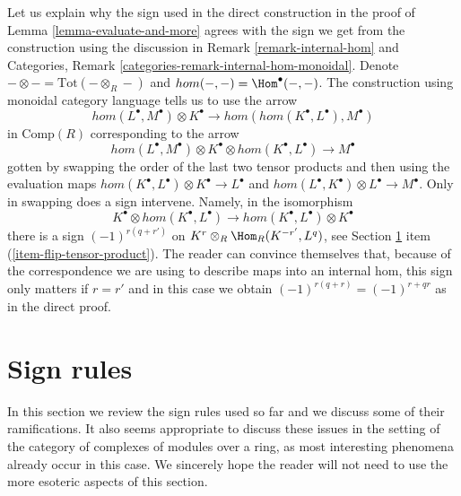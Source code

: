 \begin{remark}
\label{remark-sign-explanation}
Let us explain why the sign used in the direct construction in the proof
of Lemma \ref{lemma-evaluate-and-more} agrees with the sign we get
from the construction using the discussion in Remark \ref{remark-internal-hom}
and Categories, Remark \ref{categories-remark-internal-hom-monoidal}.
Denote $- \otimes - = \text{Tot}(- \otimes_R -)$ and
$hom(-, -) = \Hom^\bullet(-, -)$. The construction using monoidal
category language tells us to use the arrow
$$
hom(L^\bullet, M^\bullet) \otimes K^\bullet
\longrightarrow
hom(hom(K^\bullet, L^\bullet), M^\bullet)
$$
in $\text{Comp}(R)$ corresponding to the arrow
$$
hom(L^\bullet, M^\bullet) \otimes K^\bullet \otimes hom(K^\bullet, L^\bullet)
\longrightarrow
M^\bullet
$$
gotten by swapping the order of the last two tensor products and
then using the evaluation maps
$hom(K^\bullet, L^\bullet) \otimes K^\bullet \to L^\bullet$ and
$hom(L^\bullet, K^\bullet) \otimes L^\bullet \to M^\bullet$.
Only in swapping does a sign intervene. Namely, in the isomorphism
$$
K^\bullet \otimes hom(K^\bullet, L^\bullet)
\to
hom(K^\bullet, L^\bullet) \otimes K^\bullet
$$
there is a sign $(-1)^{r(q + r')}$ on
$K^r \otimes_R \Hom_R(K^{-r'}, L^q)$, see
Section \ref{section-sign-rules} item (\ref{item-flip-tensor-product}).
The reader can convince themselves that, because of the
correspondence we are using to describe maps into an internal hom,
this sign only matters if $r = r'$ and in this case
we obtain $(-1)^{r(q + r)} = (-1)^{r + qr}$ as in the direct proof.
\end{remark}







\section{Sign rules}
\label{section-sign-rules}

\noindent
In this section we review the sign rules used so far and we discuss
some of their ramifications. It also seems appropriate to discuss
these issues in the setting of the category of complexes of modules
over a ring, as most interesting phenomena already occur in this case.
We sincerely hope the reader will not
need to use the more esoteric aspects of this section.

